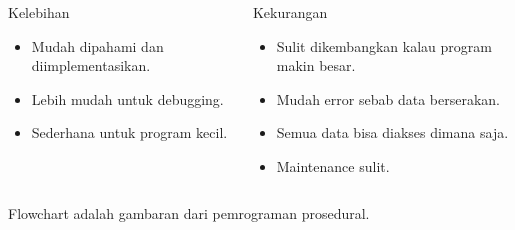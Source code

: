 \documentclass{../praktikum-ppt}
\begin{document}
  {
  \begin{frame}
    \frametitle{\insertsection}
    \framesubtitle{\insertsubsection}
    \begin{columns}
      \begin{column}{0.45\textwidth}
        \begin{block}{Kelebihan}
          \begin{itemize}
            \item Mudah dipahami dan diimplementasikan.
            \item Lebih mudah untuk debugging.
            \item Sederhana untuk program kecil.
          \end{itemize}
        \end{block}
      \end{column}
      \begin{column}{0.5\textwidth}
        \begin{block}{Kekurangan}
          \begin{itemize}
            \item Sulit dikembangkan kalau program makin besar.
            \item Mudah error sebab data berserakan.
            \item Semua data bisa diakses dimana saja.
            \item Maintenance sulit.
          \end{itemize}
        \end{block}
      \end{column}
    \end{columns}
    \begin{contoh}
      Flowchart adalah gambaran dari pemrograman prosedural.
    \end{contoh}
  \end{frame}
  }
\end{document}
